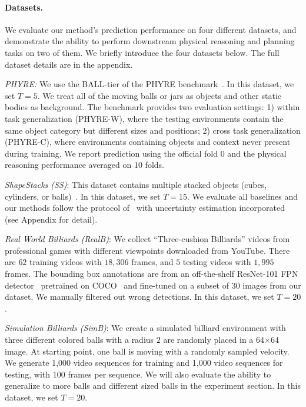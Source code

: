 \documentclass{article} \usepackage{iclr2021_conference,times}
\newcommand{\numoutput}{T}
\begin{document}
\paragraph{Datasets.}
We evaluate our method's prediction performance on four different datasets, and demonstrate the ability to perform downstream physical reasoning and planning tasks on two of them. We briefly introduce the four datasets below. The full dataset details are in the appendix.

\textit{PHYRE:} We use the BALL-tier of the PHYRE benchmark~\citep{bakhtin2019phyre}. In this dataset, we set $\numoutput=5$. We treat all of the moving balls or jars as objects and other static bodies as background. The benchmark provides two evaluation settings: 1) within task generalization (PHYRE-W), where the testing environments contain the same object category but different sizes and positions; 2) cross task generalization (PHYRE-C), where environments containing objects and context never present during training. We report prediction using the official fold 0 and the physical reasoning performance averaged on 10 folds.

\textit{ShapeStacks (SS)}: This dataset contains multiple stacked objects (cubes, cylinders, or balls)~\citep{ye2019cvp}. In this dataset, we set $\numoutput=15$. We evaluate all baselines and our methods follow the protocol of~\citep{ye2019cvp} with uncertainty estimation incorporated (see Appendix for detail).

\textit{Real World Billiards (RealB)}: We collect ``Three-cushion Billiards'' videos from professional games with different viewpoints downloaded from YouTube. There are $62$ training videos with $18,306$ frames, and $5$ testing videos with $1,995$ frames. The bounding box annotations are from an off-the-shelf ResNet-101 FPN detector~\citep{lin2017feature} pretrained on COCO~\citep{lin2014microsoft} and fine-tuned on a subset of $30$ images from our dataset. We manually filtered out wrong detections. In this dataset, we set $\numoutput=20$.

\textit{Simulation Billiards (SimB)}: We create a simulated billiard environment with three different colored balls with a radius $2$ are randomly placed in a 64$\times$64 image. At starting point, one ball is moving with a randomly sampled velocity. We generate 1,000 video sequences for training and 1,000 video sequences for testing, with 100 frames per sequence. We will also evaluate the ability to generalize to more balls and different sized balls in the experiment section. In this dataset, we set $\numoutput=20$.
\end{document}
